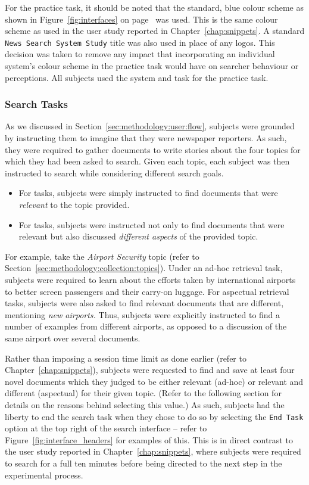 For the practice task, it should be noted that the standard, blue colour scheme as shown in Figure~\ref{fig:interfaces} on page~\pageref{fig:interfaces} was used. This is the same colour scheme as used in the user study reported in Chapter~\ref{chap:snippets}. A standard \texttt{News Search System Study} title was also used in place of any logos. This decision was taken to remove any impact that incorporating an individual system's colour scheme in the practice task would have on searcher behaviour or perceptions. All subjects used the  system and task for the practice task.

\subsubsection{Search Tasks}\label{sec:diversity:users:method:tasks}
As we discussed in Section~\ref{sec:methodology:user:flow}, subjects were grounded by instructing them to imagine that they were newspaper reporters. As such, they were required to gather documents to write stories about the four topics for which they had been asked to search. Given each topic, each subject was then instructed to search while considering different search goals.

\begin{itemize}
    \item{For  tasks, subjects were simply instructed to find documents that were \emph{relevant} to the topic provided.}
    \item{For  tasks, subjects were instructed not only to find documents that were relevant but also discussed \emph{different aspects} of the provided topic.}
\end{itemize}

For example, take the \emph{Airport Security} topic (refer to Section~\ref{sec:methodology:collection:topics}). Under an ad-hoc retrieval task, subjects were required to learn about the efforts taken by international airports to better screen passengers and their carry-on luggage. For aspectual retrieval tasks, subjects were also asked to find relevant documents that are different, mentioning \emph{new airports.} Thus, subjects were explicitly instructed to find a number of examples from different airports, as opposed to a discussion of the same airport over several documents.

 Rather than imposing a session time limit as done earlier (refer to Chapter~\ref{chap:snippets}), subjects were requested to find and save at least four novel documents which they judged to be either relevant (ad-hoc) or relevant and different (aspectual) for their given topic. (Refer to the following section for details on the reasons behind selecting this value.) As such, subjects had the liberty to end the search task when they chose to do so by selecting the \texttt{End Task} option at the top right of the search interface -- refer to Figure~\ref{fig:interface_headers} for examples of this. This is in direct contrast to the user study reported in Chapter~\ref{chap:snippets}, where subjects were required to search for a full ten minutes before being directed to the next step in the experimental process.

